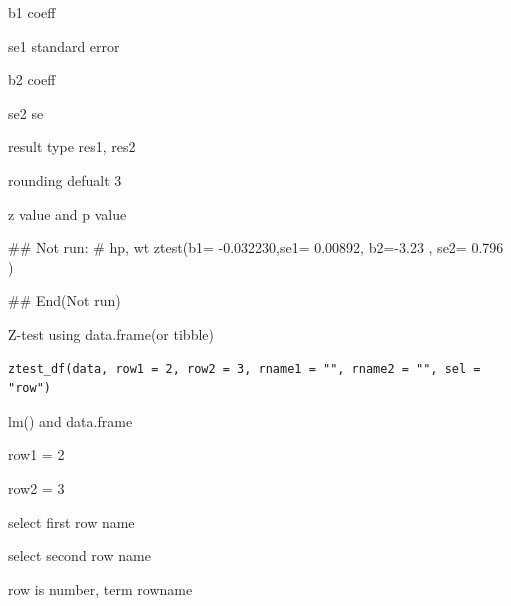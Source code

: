\documentclass[a4paper]{book}
\begin{document}
%
\begin{Arguments}
\begin{ldescription}
\item[\code{b1}] b1 coeff

\item[\code{se1}] se1 standard error

\item[\code{b2}] b2 coeff

\item[\code{se2}] se2 se

\item[\code{type}] result type res1, res2

\item[\code{digits}] rounding defualt 3
\end{ldescription}
\end{Arguments}
%
\begin{Value}
z value and p value
\end{Value}
%
\begin{Examples}
\begin{ExampleCode}
\#\# Not run: 
# hp, wt
ztest(b1= -0.032230,se1= 0.00892,   b2=-3.23 , se2= 0.796 )

## End(Not run)


\end{ExampleCode}
\end{Examples}
%
\begin{Description}
Z-test using data.frame(or tibble)
\end{Description}
%
\begin{Usage}
\begin{verbatim}
ztest_df(data, row1 = 2, row2 = 3, rname1 = "", rname2 = "", sel = "row")
\end{verbatim}
\end{Usage}
%
\begin{Arguments}
\begin{ldescription}
\item[\code{data}] lm() and data.frame

\item[\code{row1}] row1 = 2

\item[\code{row2}] row2 = 3

\item[\code{rname1}] select first row name

\item[\code{rname2}] select second row name

\item[\code{sel}] row is number, term rowname
\end{ldescription}
\end{Arguments}
\end{document}
